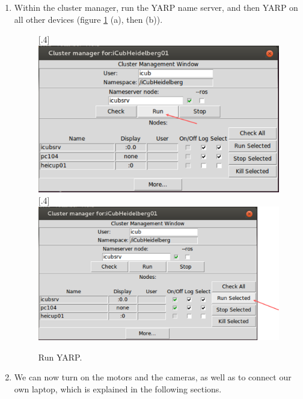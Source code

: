 \begin{enumerate}
	\newline {}
	\item Within the cluster manager, run the YARP name server, and then YARP on all other devices (figure \ref{fig::B1_cluster} (a), then (b)).
	\begin{figure}[h!]
		\centering
		[.4\linewidth]{\includegraphics[scale=.3]{chapters/13_appendix/img/ran_yarp.png}}
		[.4\linewidth]{\includegraphics[scale=.3]{chapters/13_appendix/img/ran_yarp_others.png}}
		\caption{Run YARP.}
		\label{fig::B1_cluster}
	\end{figure}
	\item We can now turn on the motors and the cameras, as well as to connect our own laptop, which is explained in the following sections.
\end{enumerate}
\FloatBarrier
